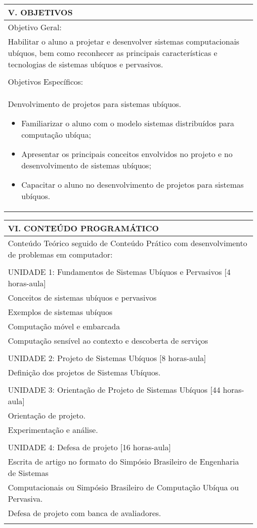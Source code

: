 \documentclass[12pt]{article}
\begin{document}
\begin{longtable}{|L{1.025\textwidth}|} \hline
%
{\bf V. OBJETIVOS } \\ \hline
Objetivo Geral: \\
Habilitar o aluno a projetar e desenvolver sistemas computacionais ubíquos, bem como reconhecer as principais características e tecnologias de sistemas ubíquos e pervasivos.\\
\\
Objetivos Específicos:\\
Denvolvimento de projetos para sistemas ubíquos.

\begin{itemize}
\item Familiarizar o aluno com o modelo sistemas distribuídos para computação ubíqua;
\item  Apresentar os principais conceitos envolvidos no projeto e no desenvolvimento de sistemas ubíquos;
\item  Capacitar o aluno no desenvolvimento de projetos para sistemas ubíquos.
\end{itemize}
\\ \hline
\end{longtable}


\begin{longtable}{|L{1.025\textwidth}|} \hline
%
{\bf VI. CONTEÚDO PROGRAMÁTICO } \\ \hline
Conteúdo Teórico seguido de Conteúdo Prático com desenvolvimento de problemas em computador: \\
\\
UNIDADE 1: Fundamentos de Sistemas Ubíquos e Pervasivos [4 horas-aula]\\
Conceitos de sistemas ubíquos e pervasivos\\
Exemplos de sistemas  ubíquos\\
Computação móvel e embarcada\\
Computação sensível ao contexto e descoberta de serviços\\
\\
UNIDADE 2: Projeto de Sistemas Ubíquos [8 horas-aula]\\
Definição dos projetos de Sistemas Ubíquos.\\
\\
UNIDADE 3: Orientação de Projeto de Sistemas Ubíquos [44 horas-aula]\\
Orientação de projeto.\\
Experimentação e análise.\\
\\
UNIDADE 4:  Defesa de projeto [16 horas-aula]\\
Escrita de artigo no formato do Simpósio Brasileiro de Engenharia de Sistemas\\ Computacionais ou Simpósio Brasileiro de Computação Ubíqua ou Pervasiva.\\
Defesa de projeto com banca de avaliadores.\\
\\ \hline
\end{longtable} 
\end{document}
